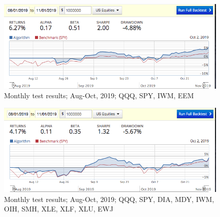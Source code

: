 \documentclass{article}
\begin{document}
\begin{figure}\label{fig:quarterly-1}
\includegraphics[width = \textwidth]{figures/ab-results-2019-11-05/ab-quarterly-aug-nov-2019.png}
\caption{Monthly test results; Aug-Oct, 2019; QQQ, SPY, IWM, EEM}
\end{figure}

\begin{figure}\label{fig:quarterly-2}
\includegraphics[width = \textwidth]{figures/ab-results-2019-11-05/ab-quarterly-aug-nov-2019-11-ETFs.png}
\caption{Monthly test results; Aug-Oct, 2019; QQQ, SPY, DIA, MDY, IWM, OIH, SMH, XLE, XLF, XLU, EWJ}
\end{figure}
\end{document}
